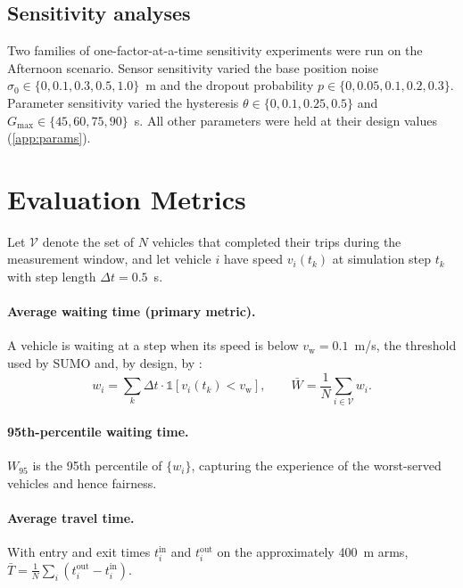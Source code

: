 \subsection{Sensitivity analyses}
Two families of one-factor-at-a-time sensitivity experiments were run on the Afternoon scenario. Sensor sensitivity varied the base position noise $\sigma_0 \in \{0, 0.1, 0.3, 0.5, 1.0\}$~m and the dropout probability $p \in \{0, 0.05, 0.1, 0.2, 0.3\}$. Parameter sensitivity varied the hysteresis $\theta \in \{0, 0.1, 0.25, 0.5\}$ and $G_{\max} \in \{45, 60, 75, 90\}$~s. All other parameters were held at their design values (\cref{app:params}).

\section{Evaluation Metrics}\label{sec:method-metrics}

Let $\mathcal{V}$ denote the set of $N$ vehicles that completed their trips during the measurement window, and let vehicle $i$ have speed $v_i(t_k)$ at simulation step $t_k$ with step length $\Delta t = 0.5$~s.

\paragraph{Average waiting time (primary metric).} A vehicle is waiting at a step when its speed is below $v_{\text{w}} = 0.1$~m/s, the threshold used by SUMO and, by design, by \dtx{}:
\begin{equation}
  w_i = \sum_{k} \Delta t \cdot \mathbb{1}\!\left[v_i(t_k) < v_{\text{w}}\right], \qquad
  \bar{W} = \frac{1}{N}\sum_{i \in \mathcal{V}} w_i .
  \label{eq:wait}
\end{equation}

\paragraph{95th-percentile waiting time.} $W_{95}$ is the 95th percentile of $\{w_i\}$, capturing the experience of the worst-served vehicles and hence fairness.

\paragraph{Average travel time.} With entry and exit times $t_i^{\text{in}}$ and $t_i^{\text{out}}$ on the approximately 400~m arms, $\bar{T} = \frac{1}{N}\sum_i (t_i^{\text{out}} - t_i^{\text{in}})$.

